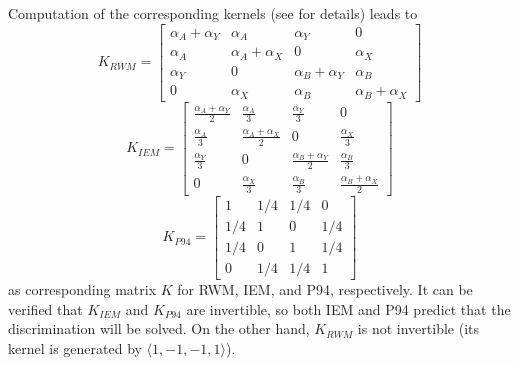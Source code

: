 \documentclass[]{interact}
\theoremstyle{plain}%
\theoremstyle{definition}
\theoremstyle{remark}
\begin{document}
Computation of the corresponding kernels (see \cite{A24} for details) leads to 
\[
K_{RWM}=\begin{bmatrix}
\alpha_A+\alpha_Y & \alpha_A 		& \alpha_Y  			& 0\\
\alpha_A		& \alpha_A+\alpha_X & 0					 & \alpha_X\\
\alpha_Y			& 0 			& \alpha_B+\alpha_Y & \alpha_B\\
0			& \alpha_X					& \alpha_B 			& \alpha_B+\alpha_X
\end{bmatrix}
\]
\[
K_{IEM}=\begin{bmatrix}
\frac{\alpha_A+\alpha_Y}{2} & \frac{\alpha_A}{3} & \frac{\alpha_Y}{3} & 0\\
\frac{\alpha_A}{3} & \frac{\alpha_A+\alpha_X}{2} & 0 & \frac{\alpha_X}{3}\\
\frac{\alpha_Y}{3} & 0 & \frac{\alpha_B+\alpha_Y}{2} & \frac{\alpha_B}{3}\\
0 & \frac{\alpha_X}{3} & \frac{\alpha_B}{3} & \frac{\alpha_B+\alpha_X}{2}
\end{bmatrix}
\]
\[
K_{P94}=\begin{bmatrix}
1 & 1/4 & 1/4 & 0\\
1/4 & 1 & 0 & 1/4\\
1/4 & 0 & 1 & 1/4\\
0 & 1/4 & 1/4 & 1
\end{bmatrix}
\]
as corresponding matrix $K$ for RWM, IEM, and P94, respectively. 
It can be verified that $K_{IEM}$ and $K_{P94}$ are invertible, so both IEM and P94 predict that the discrimination will be solved. 
On the other hand, $K_{RWM}$ is not invertible (its kernel is generated by $\langle 1, -1 , -1 , 1\rangle$). 
\end{document}
